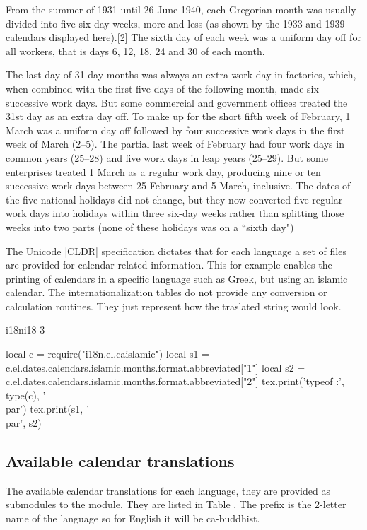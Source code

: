 From the summer of 1931 until 26 June 1940, each Gregorian month was usually divided into five six-day weeks, more and less (as shown by the 1933 and 1939 calendars displayed here).[2] The sixth day of each week was a uniform day off for all workers, that is days 6, 12, 18, 24 and 30 of each month. 

The last day of 31-day months was always an extra work day in factories, which, when combined with the first five days of the following month, made six successive work days. But some commercial and government offices treated the 31st day as an extra day off. To make up for the short fifth week of February, 1 March was a uniform day off followed by four successive work days in the first week of March (2–5). The partial last week of February had four work days in common years (25–28) and five work days in leap years (25–29). But some enterprises treated 1 March as a regular work day, producing nine or ten successive work days between 25 February and 5 March, inclusive. The dates of the five national holidays did not change, but they now converted five regular work days into holidays within three six-day weeks rather than splitting those weeks into two parts (none of these holidays was on a ``sixth day")


The Unicode |CLDR| specification dictates that for each language a set of files are provided for calendar related information. This for example enables the printing of calendars in a specific language such as Greek, but using an islamic calendar.  The internationalization tables do not provide any conversion or calculation routines. They just represent how the traslated string would look. 

\begin{texexample}{i18n}{i18-3}
\begin{luacode}
local c = require("i18n.el.caislamic")
local s1 = c.el.dates.calendars.islamic.months.format.abbreviated["1"]
local s2 = c.el.dates.calendars.islamic.months.format.abbreviated["2"]
tex.print('typeof :', type(c), '\\par')
tex.print(s1, '\\par', s2)
\end{luacode}
\end{texexample}

\subsection{Available calendar translations}

The available calendar translations for each language, they are provided as submodules to the  module. They are listed in Table    . The prefix is the 2-letter name of the language so for English it will be ca-buddhist.

